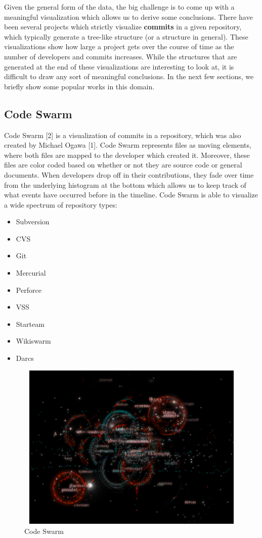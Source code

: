 \documentclass{article}
\begin{document}
Given the general form of the data, the big challenge is to come up with a meaningful visualization which allows us to derive some conclusions.  There have been several projects which strictly visualize \textbf{commits} in a given repository, which typically generate a tree-like structure (or a structure in general). These visualizations show how large a project gets over the course of time as the number of developers and commits increases. While the structures that are generated at the end of these visualizations are interesting to look at, it is difficult to draw any sort of meaningful conclusions. In the next few sections, we briefly show some popular works in this domain.

\subsection {Code Swarm}

Code Swarm [2] is a visualization of commits in a repository, which was also created by Michael Ogawa [1]. Code Swarm represents files as moving elements, where both files are mapped to the developer which created it. Moreover, these files are color coded based on whether or not they are source code or general documents. When developers drop off in their contributions, they fade over time from the underlying histogram at the bottom which allows us to keep track of what events have occurred before in the timeline. Code Swarm is able to visualize a wide spectrum of repository types: 

\begin {itemize}
	\item {Subversion}
	\item {CVS}
	\item {Git}
	\item {Mercurial}
	\item {Perforce}
	\item {VSS}
	\item {Starteam}
	\item {Wikiswarm}
	\item {Darcs}
\end {itemize}

\begin{figure}[h!]
\centering
\includegraphics[height=8cm, width=12cm]{swarm}
\caption{Code Swarm}
\end{figure}
\end{document}
